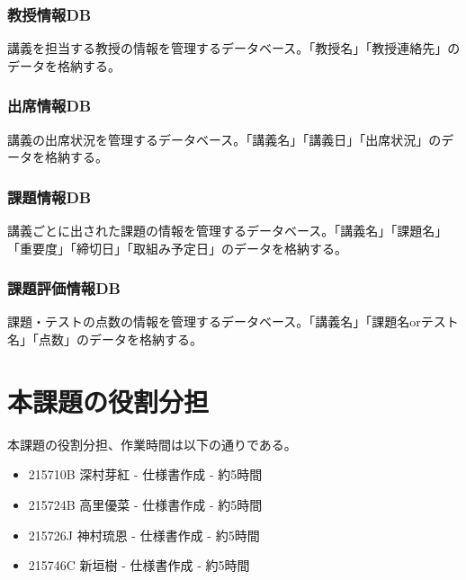 \documentclass[a4paper, 11pt, titlepage]{jsarticle}
\begin{document}
\subsubsection{教授情報DB}
講義を担当する教授の情報を管理するデータベース。「教授名」「教授連絡先」のデータを格納する。
\subsubsection{出席情報DB}
講義の出席状況を管理するデータベース。「講義名」「講義日」「出席状況」のデータを格納する。
\subsubsection{課題情報DB}
講義ごとに出された課題の情報を管理するデータベース。「講義名」「課題名」「重要度」「締切日」「取組み予定日」のデータを格納する。
\subsubsection{課題評価情報DB}
課題・テストの点数の情報を管理するデータベース。「講義名」「課題名orテスト名」「点数」のデータを格納する。

\section{本課題の役割分担}
本課題の役割分担、作業時間は以下の通りである。
\begin{itemize}
\item 215710B 深村芽紅 - 仕様書作成 - 約5時間
\item 215724B 高里優菜 - 仕様書作成 - 約5時間
\item 215726J 神村琉恩 - 仕様書作成 - 約5時間
\item 215746C 新垣樹 - 仕様書作成 - 約5時間
\end{itemize}
\end{document}
